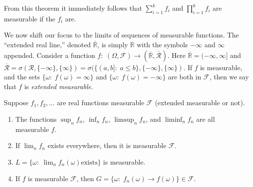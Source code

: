 \documentclass[11pt,fleqn]{book} %
\begin{document}
From this theorem it immediately follows that $\sum_{i=1}^k f_i$ and $\prod_{i=1}^k f_i$ are measurable if the $f_i$ are.

\vspace{10pt}

We now shift our focus to the limits of sequences of measurable functions. The ``extended real line,'' denoted $\overline{\mathbb{R}}$, is simply $\mathbb{R}$ with the symbols $-\infty$ and $\infty$ appended. Consider a function $f:\;(\Omega,\mathcal{F}) \to (\overline{\mathbb{R}}, \overline{\mathcal{R}})$. Here $\overline{\mathbb{R}} = (-\infty,\infty]$ and $\overline{\mathcal{R}} = \sigma(\mathcal{R},\{-\infty\},\{\infty\}) = \sigma(\{(a,b]:\;a \leq b\},\{-\infty\},\{\infty\})$. If $f$ is measurable, and the sets $\{\omega:\;f(\omega) = \infty\}$ and $\{\omega:\;f(\omega) = -\infty\}$ are both in $\mathcal{F}$, then we say that $f$ is \emph{extended measurable}.

\begin{theorem} \label{thm:real-measurable-functions-properties}
	Suppose $f_1,f_2,\dots$ are real functions measurable $\mathcal{F}$ (extended measurable or not).
	\begin{enumerate}[label=(\alph*)]
		\item The functions $\sup_n f_n$, $\inf_n f_n$, $\limsup_n f_n$, and $\liminf_n f_n$ are all measurable $f$.
		\item If $\lim_n f_n$ exists everywhere, then it is measurable $\mathcal{F}$.
		\item $L = \{\omega:\;\lim_n f_n(\omega) \textrm{exists}\}$ is measurable.
		\item If $f$ is measurable $\mathcal{F}$, then $G = \{\omega:\;f_n(\omega) \to f(\omega)\} \in \mathcal{F}$.
	\end{enumerate}
\end{theorem}
\end{document}
